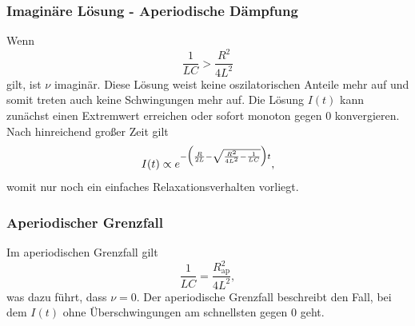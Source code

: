         \subsubsection{Imaginäre Lösung - Aperiodische Dämpfung}    
            Wenn
            \begin{equation}
                \label{eqn:bedingung_imaginär}
                \frac{1}{L C} > \frac{R^2}{4 L^2}
            \end{equation}
            gilt, ist $\nu$ imaginär.
            Diese Lösung weist keine oszilatorischen Anteile mehr auf und somit treten auch keine Schwingungen mehr auf. Die Lösung
            $I(t)$ kann zunächst einen Extremwert erreichen oder sofort monoton gegen $0$ konvergieren.
            Nach hinreichend großer Zeit gilt
            \begin{equation}
                \label{eqn:imag_lösung}
                I(t) \propto e^{-\Bigl(\frac{R}{2 L} - \sqrt{\frac{R^2}{4 L^2} - \frac {1}{L C}}\Bigr) t},
            \end{equation}
            womit nur noch ein einfaches Relaxationsverhalten vorliegt.
        
        \subsubsection{Aperiodischer Grenzfall}
            Im aperiodischen Grenzfall gilt
            \begin{equation}
                \label{eqn:bedingung_aperiodischerGrenzfall}
                \frac{1}{L C} = \frac {R_\text{ap}^2} {4 L^2},
            \end{equation}
            was dazu führt, dass $\nu = 0$.
            Der aperiodische Grenzfall beschreibt den Fall, bei dem $I(t)$ ohne Überschwingungen am schnellsten gegen $0$ geht.

